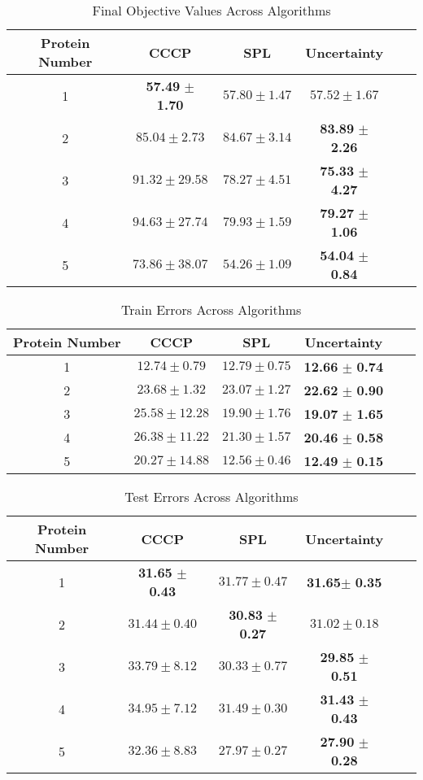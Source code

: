 \documentclass[12pt]{article}
\begin{document}
\begin{table}
\caption{Final Objective Values Across Algorithms}
\begin{center}
\begin{tabular}{|c|c|c|c|c|c|}
\hline Protein Number  & CCCP & SPL & Uncertainty \\\hline
1 & \textbf{57.49} $\pm$ \textbf{1.70} & $57.80 \pm 1.47$ & $57.52 \pm 1.67$\\
2 & $85.04 \pm 2.73$ & $84.67 \pm 3.14$ & \textbf{83.89} $\pm$ \textbf{2.26}\\
3 & $91.32 \pm 29.58$ & $78.27 \pm 4.51$ & \textbf{75.33} $\pm$ \textbf{4.27}\\
4 & $94.63 \pm 27.74$ & $79.93 \pm 1.59$ & \textbf{79.27} $\pm$ \textbf{1.06}\\
5 & $73.86 \pm 38.07$ & $54.26 \pm 1.09$ & \textbf{54.04} $\pm$ \textbf{0.84}\\\hline
\end{tabular}
\end{center}
\end{table}

\begin{table}
\caption{Train Errors Across Algorithms}
\begin{center}
\begin{tabular}{|c|c|c|c|c|c|}
\hline Protein Number  & CCCP & SPL & Uncertainty \\\hline
1 & $12.74 \pm 0.79$ & $12.79 \pm 0.75$ & \textbf{12.66} $\pm$ \textbf{0.74}\\
2 & $23.68 \pm 1.32$ & $23.07 \pm 1.27$ & \textbf{22.62} $\pm$ \textbf{0.90}\\
3 & $25.58 \pm 12.28$ & $19.90 \pm 1.76$ & \textbf{19.07} $\pm$ \textbf{1.65}\\
4 & $26.38 \pm 11.22$ & $21.30 \pm 1.57$ & \textbf{20.46} $\pm$ \textbf{0.58}\\
5 & $20.27 \pm 14.88$ & $12.56 \pm 0.46$ & \textbf{12.49} $\pm$ \textbf{0.15}\\\hline
\end{tabular}
\end{center}
\end{table}

\begin{table}
\caption{Test Errors Across Algorithms}
\begin{center}
\begin{tabular}{|c|c|c|c|c|c|}
\hline Protein Number  & CCCP & SPL & Uncertainty \\\hline
1 & \textbf{31.65} $\pm$ \textbf{0.43} & $31.77 \pm 0.47$ & \textbf{31.65}$\pm$ \textbf{0.35}\\
2 & $31.44 \pm 0.40$ & \textbf{30.83} $\pm$ \textbf{0.27} & $31.02 \pm 0.18$\\
3 & $33.79 \pm 8.12$ & $30.33 \pm 0.77$ & \textbf{29.85} $\pm$ \textbf{0.51}\\
4 & $34.95 \pm 7.12$ & $31.49 \pm 0.30$ & \textbf{31.43} $\pm$ \textbf{0.43}\\
5 & $32.36 \pm 8.83$ & $27.97 \pm 0.27$ & \textbf{27.90} $\pm$ \textbf{0.28}\\\hline
\end{tabular}
\end{center}
\end{table}
\end{document}
